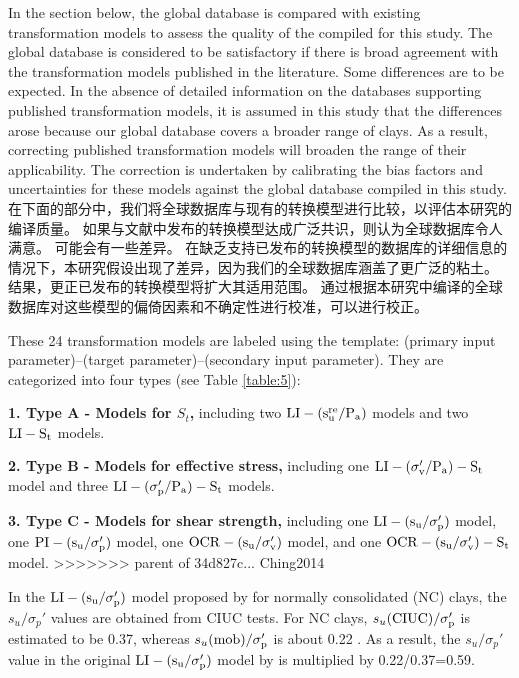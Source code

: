 \begin{paracol}{2}
\begin{enumerate}
\begin{Parallel}{0.60\textwidth}{}
    {
        In the section below, the global database is compared with existing transformation models to assess the quality of the  compiled for this study. The global database is considered to be satisfactory if there is broad agreement with the transformation models published in the literature. Some differences are to be expected. In the absence of detailed information on the databases supporting published transformation models, it is assumed in this study that the differences arose because our global database covers a broader range of clays. As a result, correcting published transformation models will broaden the range of their applicability. The correction is undertaken by calibrating the bias factors and uncertainties for these models against the global database compiled in this study.
    }
    \ParallelRText
    {
        在下面的部分中，我们将全球数据库与现有的转换模型进行比较，以评估本研究的编译质量。 如果与文献中发布的转换模型达成广泛共识，则认为全球数据库令人满意。 可能会有一些差异。 在缺乏支持已发布的转换模型的数据库的详细信息的情况下，本研究假设出现了差异，因为我们的全球数据库涵盖了更广泛的粘土。 结果，更正已发布的转换模型将扩大其适用范围。 通过根据本研究中编译的全球数据库对这些模型的偏倚因素和不确定性进行校准，可以进行校正。
    }
    \ParallelPar
    \ParallelLText
    {
        These 24 transformation models are labeled using the template: (primary input parameter)–(target parameter)–(secondary input parameter). They are categorized into four types (see Table \ref{table:5}):

        \textbf{1. Type A - Models for $S_t$,} including two $\rm{LI}-(s_u^{re}/P_a)$ models and two $\rm{LI}-S_t$ models.

        \textbf{2. Type B - Models for effective stress,} including one $\rm{LI}-(\sigma_v'/P_a)-S_t$ model and three $\rm{LI}-(\sigma_p'/P_a)-S_t$ models.

        \textbf{3. Type C - Models for shear strength,} including one $\rm{LI}-(s_u/\sigma_p')$ model, one $\rm{PI}-(s_u/\sigma_p')$ model, one $\rm{OCR}-(s_u/\sigma_v')$ model, and one $\rm{OCR}-(s_u/\sigma_v')-S_t$ model. 
>>>>>>> parent of 34d827c... Ching2014

        In the $\rm{LI}-(s_u/\sigma_p')$ model proposed by \citet{Bjerrum1960711} for normally consolidated (NC) clays, the $s_u/\sigma_p'$ values are obtained from CIUC tests. For NC clays, $s_u(\rm{CIUC})/\sigma_p'$ is estimated to be 0.37, whereas $s_u(\rm{mob})/\sigma_p'$ is about 0.22 \citep{Mesri1975409}. As a result, the $s_u/\sigma_p'$ value in the original $\rm{LI}-(s_u/\sigma_p')$ model by \citet{Bjerrum1960711} is multiplied by 0.22/0.37=0.59.

}
\end{Parallel}
\end{enumerate}
\end{paracol}
